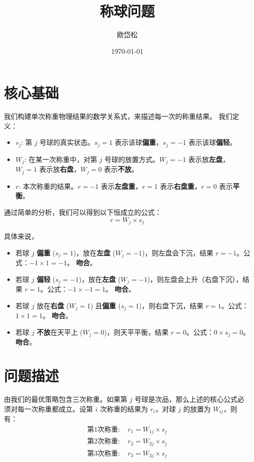 \documentclass[12pt, a4paper]{ctexart}
\title{称球问题}
\author{欧岱松}
\date{\today}
\begin{document}
\maketitle

\section{核心基础}

我们构建单次称重物理结果的数学关系式，来描述每一次的称重结果。
我们定义：
\begin{itemize}
    \item $s_j$: 第 $j$ 号球的真实状态。$s_j=1$ 表示该球\textbf{偏重}，$s_j=-1$ 表示该球\textbf{偏轻}。
    \item $W_j$: 在某一次称重中，对第 $j$ 号球的放置方式。$W_j=-1$ 表示放\textbf{左盘}，$W_j=1$ 表示放\textbf{右盘}，$W_j=0$ 表示\textbf{不放}。
    \item $r$: 本次称重的结果。$r=-1$ 表示\textbf{左盘重}，$r=1$ 表示\textbf{右盘重}，$r=0$ 表示\textbf{平衡}。
\end{itemize}
通过简单的分析，我们可以得到以下恒成立的公式：
\begin{equation}
    r = W_j \times s_j
\end{equation}

具体来说，
\begin{itemize}
    \item 若球 $j$ \textbf{偏重} ($s_j=1$)，放在\textbf{左盘} ($W_j=-1$)，则左盘会下沉，结果 $r=-1$。公式：$-1 \times 1 = -1$。 \textbf{吻合}。
    \item 若球 $j$ \textbf{偏轻} ($s_j=-1$)，放在\textbf{左盘} ($W_j=-1$)，则左盘会上升（右盘下沉），结果 $r=1$。公式：$-1 \times -1 = 1$。 \textbf{吻合}。
    \item 若球 $j$ 放在\textbf{右盘} ($W_j=1$) 且\textbf{偏重} ($s_j=1$)，则右盘下沉，结果 $r=1$。公式：$1 \times 1 = 1$。 \textbf{吻合}。
    \item 若球 $j$ \textbf{不放}在天平上 ($W_j=0$)，则天平平衡，结果 $r=0$。公式：$0 \times s_j = 0$。 \textbf{吻合}。
\end{itemize}

\section{问题描述}

由我们的最优策略包含三次称重。如果第 $j$ 号球是次品，那么上述的核心公式必须对每一次称重都成立。设第 $i$ 次称重的结果为 $r_i$，对球 $j$ 的放置为 $W_{ij}$，则有：
\begin{align*}
    \text{第1次称重: } & r_1 = W_{1j} \times s_j \\
    \text{第2次称重: } & r_2 = W_{2j} \times s_j \\
    \text{第3次称重: } & r_3 = W_{3j} \times s_j
\end{align*}
\end{document}
